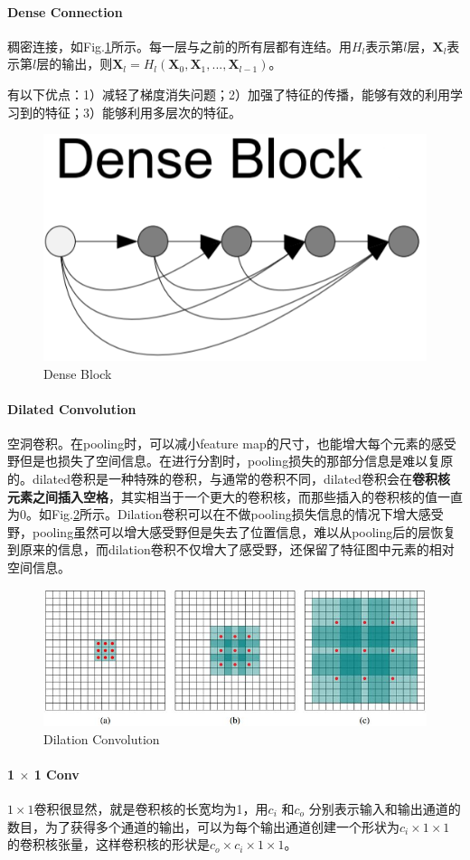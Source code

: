 \paragraph{Dense Connection}
稠密连接，如Fig.\ref{fig:dense block}所示。每一层与之前的所有层都有连结。用$H_l$表示第$l$层，$\boldsymbol{X}_l$表示第$l$层的输出，则$\boldsymbol{X}_l = H_l(\boldsymbol{X}_0, \boldsymbol{X}_1, ..., \boldsymbol{X}_{l-1})$。

有以下优点：1）减轻了梯度消失问题；2）加强了特征的传播，能够有效的利用学习到的特征；3）能够利用多层次的特征。
\begin{figure}[h]
	\centering
	\includegraphics[width=.4\textwidth]{pics/dense block.png}
	\caption{Dense Block}
	\label{fig:dense block}
\end{figure}

\paragraph{Dilated Convolution}空洞卷积。在pooling时，可以减小feature map的尺寸，也能增大每个元素的感受野但是也损失了空间信息。在进行分割时，pooling损失的那部分信息是难以复原的。dilated卷积是一种特殊的卷积，与通常的卷积不同，dilated卷积会在\textbf{卷积核元素之间插入空格}，其实相当于一个更大的卷积核，而那些插入的卷积核的值一直为0。如Fig.\ref{fig:dilation}所示。Dilation卷积可以在不做pooling损失信息的情况下增大感受野，pooling虽然可以增大感受野但是失去了位置信息，难以从pooling后的层恢复到原来的信息，而dilation卷积不仅增大了感受野，还保留了特征图中元素的相对空间信息。
\begin{figure}[h]
	\centering
	\includegraphics[width=.8\textwidth]{pics/dilation.jpg}
	\caption{Dilation Convolution}
	\label{fig:dilation}
\end{figure}

\paragraph{1 $\times$ 1 Conv}
$1\times 1$卷积很显然，就是卷积核的长宽均为1，用$c_i$ 和$c_o$  分别表示输入和输出通道的数目，为了获得多个通道的输出，可以为每个输出通道创建一个形状为$c_i\times 1 \times 1$ 的卷积核张量，这样卷积核的形状是$c_o \times c_i \times 1 \times 1$。

